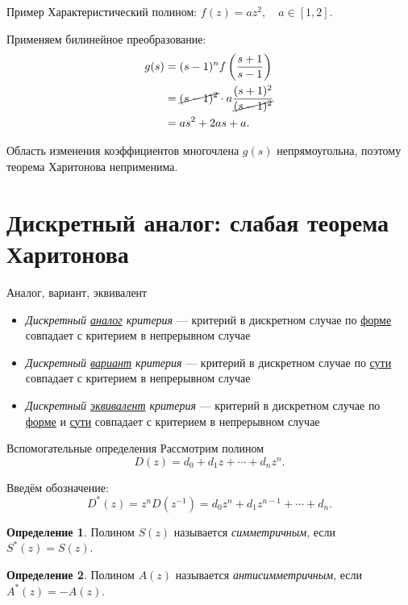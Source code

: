 \documentclass[notheorems,aspectratio=169]{beamer}
\theoremstyle{definition}
\newtheorem{definition}{Определение}
\newcommand{\paren}[1]{\left( #1 \right)}
\renewcommand{\emph}[1]{\uline{#1}}
\begin{document}
\begin{frame}{Пример}
  Характеристический полином: $f(z) = az^2, \quad a \in [1, 2]$.

  Применяем билинейное преобразование:
  \begin{equation*}
    \begin{aligned}
      g(s) &= (s-1)^n f\paren{\frac{s+1}{s-1}} \\
      &= \cancel{(s - 1)^2} \cdot a \frac{(s + 1)^2}{\cancel{(s - 1)^2}} \\
      &= as^2 + 2as + a.
    \end{aligned}
  \end{equation*}

  Область изменения коэффициентов многочлена $g(s)$ непрямоугольна, поэтому теорема Харитонова неприменима.
\end{frame}

\section{Дискретный аналог: слабая теорема Харитонова}

\begin{frame}{Аналог, вариант, эквивалент \cite{JuryMansour1985}}
  \begin{itemize}
  \item \textit{Дискретный \emph{аналог} критерия} --- критерий в дискретном случае по \emph{форме}
    совпадает с критерием в непрерывном случае
  \item \textit{Дискретный \emph{вариант} критерия} --- критерий в дискретном случае по \emph{сути}
    совпадает с критерием в непрерывном случае
  \item \textit{Дискретный \emph{эквивалент} критерия} --- критерий в дискретном случае по \emph{форме} и \emph{сути}
    совпадает с критерием в непрерывном случае

  \end{itemize}
\end{frame}

\begin{frame}{Вспомогательные определения}
  Рассмотрим полином
  \begin{equation*}
    D(z) = d_0 + d_1 z + \cdots + d_n z^n.
  \end{equation*}

  Введём обозначение:
  \begin{equation*}
    D^*(z) = z^n D(z^{-1}) = d_0 z^n + d_1 z^{n-1} + \cdots + d_n.
  \end{equation*}

  \begin{definition}
    Полином $S(z)$ называется \textit{симметричным}, если $S^*(z) = S(z)$.
  \end{definition}

  \begin{definition}
    Полином $A(z)$ называется \textit{антисимметричным}, если $A^*(z) = -A(z)$.
  \end{definition}
\end{frame}
\end{document}
